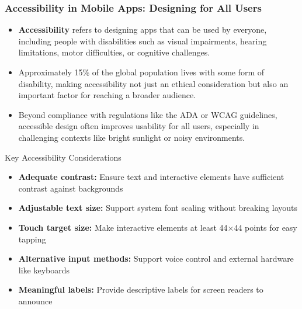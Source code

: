 \documentclass{beamer}
\begin{document}
	\begin{frame}
		\frametitle{Accessibility in Mobile Apps: Designing for All Users}
		
		\begin{itemize}
			\item \textbf{Accessibility} refers to designing apps that can be used by everyone, including people with disabilities such as visual impairments, hearing limitations, motor difficulties, or cognitive challenges.
			\item Approximately 15\% of the global population lives with some form of disability, making accessibility not just an ethical consideration but also an important factor for reaching a broader audience.
			\item Beyond compliance with regulations like the ADA or WCAG guidelines, accessible design often improves usability for all users, especially in challenging contexts like bright sunlight or noisy environments.
		\end{itemize}
		
		\begin{block}{\scriptsize{Key Accessibility Considerations}}
			\scriptsize{
				\begin{itemize}
					\item \textbf{Adequate contrast:} Ensure text and interactive elements have sufficient contrast against backgrounds
					\item \textbf{Adjustable text size:} Support system font scaling without breaking layouts
					\item \textbf{Touch target size:} Make interactive elements at least 44×44 points for easy tapping
					\item \textbf{Alternative input methods:} Support voice control and external hardware like keyboards
					\item \textbf{Meaningful labels:} Provide descriptive labels for screen readers to announce
				\end{itemize}
			}
		\end{block}
		
	\end{frame}
	
\end{document}

